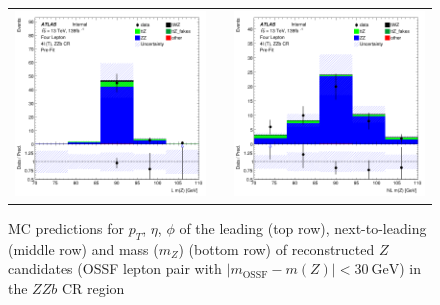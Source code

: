 \begin{figure}[htbp]
\begin{tabular}{ccc}
    \includegraphics[width=.2\textwidth]{figures/PreFitPlots/lep4_ZZb_4T_0_Z_mass} & &
    \includegraphics[width=.2\textwidth]{figures/PreFitPlots/lep4_ZZb_4T_1_Z_mass}

  \end{tabular}
    \caption{MC predictions for $p_{T}$, $\eta$, $\phi$ of the leading (top row), next-to-leading (middle row) and mass ($m_Z$) (bottom row) of reconstructed $Z$ candidates (OSSF lepton pair with $|m_{\text{OSSF}} - m(Z)| <  \SI{30}{\GeV}$) in the $ZZb$ CR region }
  \label{fig:4lep-ZZb-CR-ZCands-Plots}
\end{figure}




